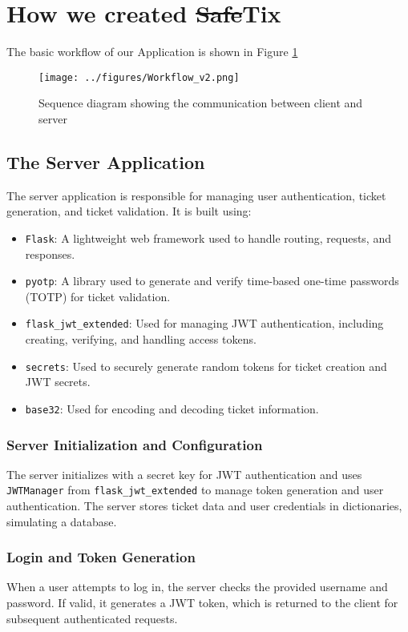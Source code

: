 \section{How we created \sout{Safe}Tix}
The basic workflow of our Application is shown in Figure \ref{fig:WorkFlow1}
\begin{figure}[H]
    \centering
    \texttt{[image: ../figures/Workflow\_v2.png]}
    \caption{Sequence diagram showing the communication between client and server}
    \label{fig:WorkFlow1}
\end{figure}
\subsection{The Server Application}

The server application is responsible for managing user authentication, ticket generation, and ticket validation. It is built using:
\begin{itemize}
    \item \texttt{Flask}: A lightweight web framework used to handle routing, requests, and responses.
    \item \texttt{pyotp}: A library used to generate and verify time-based one-time passwords (TOTP) for ticket validation.
    \item \texttt{flask\_jwt\_extended}: Used for managing JWT authentication, including creating, verifying, and handling access tokens.
    \item \texttt{secrets}: Used to securely generate random tokens for ticket creation and JWT secrets.
    \item \texttt{base32}: Used for encoding and decoding ticket information.
\end{itemize}

\subsubsection{Server Initialization and Configuration}
The server initializes with a secret key for JWT authentication and uses \texttt{JWTManager} from \texttt{flask\_jwt\_extended} to manage token generation and user authentication. The server stores ticket data and user credentials in dictionaries, simulating a database.

\subsubsection{Login and Token Generation}
When a user attempts to log in, the server checks the provided username and password. If valid, it generates a JWT token, which is returned to the client for subsequent authenticated requests.

